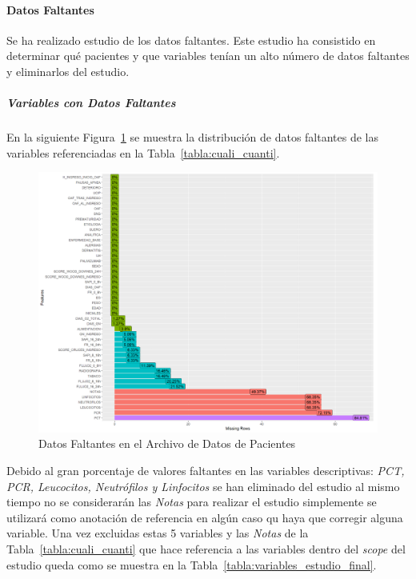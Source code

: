 \paragraph{Datos Faltantes}

Se ha realizado estudio de los datos faltantes. Este estudio ha consistido en determinar qué pacientes y que variables tenían un alto número de datos faltantes y eliminarlos del estudio. 

\subparagraph*{Variables con Datos Faltantes} 

En la siguiente Figura~\ref{fig:missing-descriptive} se muestra la distribución de datos faltantes de las variables referenciadas en la Tabla~\ref{tabla:cuali_cuanti}. 
\begin{figure}[H]
    \centering
    \includegraphics[scale = 0.70]{./img/missig-data-descriptive.png}
    \caption{Datos Faltantes en el Archivo de Datos de Pacientes}
    \label{fig:missing-descriptive}
\end{figure}

Debido al gran porcentaje de valores faltantes en las variables descriptivas: \textit{PCT, PCR, Leucocitos, Neutrófilos y Linfocitos } se han eliminado del estudio al mismo tiempo no se considerarán las \textit{Notas} para realizar el estudio simplemente se utilizará como anotación de referencia en algún caso qu haya que corregir alguna variable. Una vez excluidas estas 5 variables y las \textit{Notas} de la Tabla~\ref{tabla:cuali_cuanti} que hace referencia a las variables dentro del \textit{scope} del estudio queda como se muestra en la Tabla~\ref{tabla:variables_estudio_final}.


